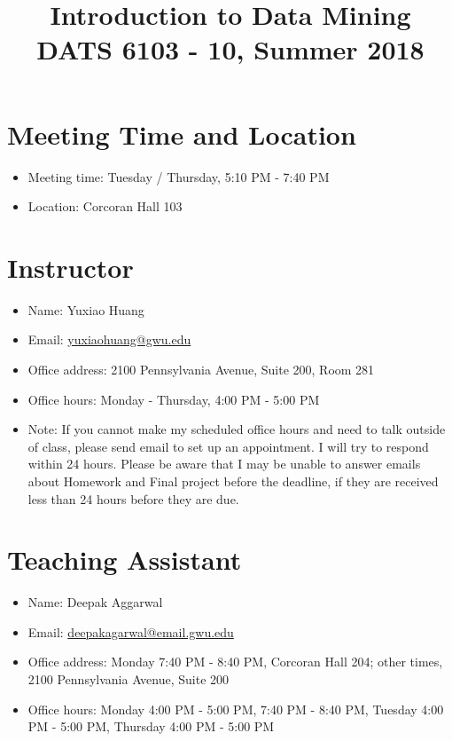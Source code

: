 \documentclass[pdftex,11pt]{artikel3}
\title{\centering Introduction to Data Mining \\ DATS 6103 - 10, Summer 2018
}
\author{}
\date{}
\begin{document}
\maketitle

\vspace{-10mm}
\begin{tiny}
\hfill \date{}
\end{tiny}
\vspace{-10mm}

\section{Meeting Time and Location}
\begin{itemize}
\item Meeting time: Tuesday / Thursday, 5:10 PM - 7:40 PM
\item Location: Corcoran Hall 103
\end{itemize}

\section{Instructor}
\begin{itemize}
\item Name: Yuxiao Huang
\item Email: \href{mailto:yuxiaohuang@email.gwu.edu}{yuxiaohuang@gwu.edu}
\item Office address: 2100 Pennsylvania Avenue, Suite 200, Room 281
\item Office hours: Monday - Thursday, 4:00 PM - 5:00 PM
\item Note: If you cannot make my scheduled office hours and need to talk outside of class, please send email to set up an appointment. I will try to respond within 24 hours. Please be aware that I may be unable to answer emails about Homework and Final project before the deadline, if they are received less than 24 hours before they are due.
\end{itemize}

\section{Teaching Assistant}
\begin{itemize}
\item Name: Deepak Aggarwal
\item Email: \href{mailto:deepakagarwal@email.gwu.edu}{deepakagarwal@email.gwu.edu} 
\item Office address: Monday 7:40 PM - 8:40 PM, Corcoran Hall 204; other times, 2100 Pennsylvania Avenue, Suite 200
\item Office hours: Monday 4:00 PM - 5:00 PM, 7:40 PM - 8:40 PM, Tuesday 4:00 PM - 5:00 PM, Thursday 4:00 PM - 5:00 PM
\end{itemize}
\end{document}
